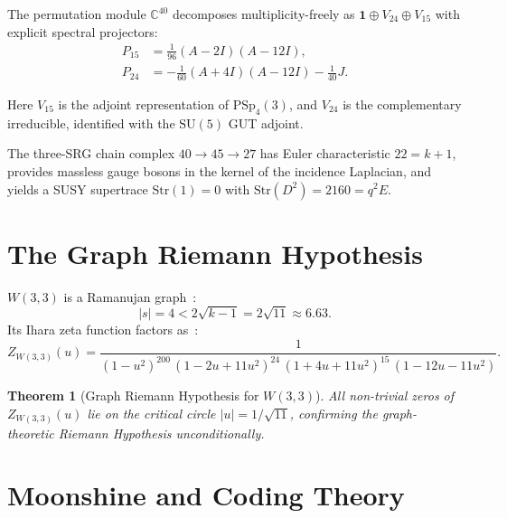 \documentclass[12pt,a4paper]{article}
\newtheorem{theorem}{Theorem}[section]
\begin{document}
The permutation module $\mathbb{C}^{40}$ decomposes multiplicity-freely as
$\mathbf{1} \oplus V_{24} \oplus V_{15}$ with explicit spectral projectors:
\begin{align}
  P_{15} &= \frac{1}{96}(A - 2I)(A - 12I),\\
  P_{24} &= -\frac{1}{60}(A + 4I)(A - 12I) - \frac{1}{40}J.
\end{align}

Here $V_{15}$ is the adjoint representation of $\mathrm{PSp}_4(3)$, and $V_{24}$
is the complementary irreducible, identified with the $\mathrm{SU}(5)$ GUT adjoint.

The three-SRG chain complex $40 \to 45 \to 27$ has Euler characteristic $22 = k+1$,
provides massless gauge bosons in the kernel of the incidence Laplacian, and yields
a SUSY supertrace $\mathrm{Str}(1) = 0$ with $\mathrm{Str}(D^2) = 2160 = q^2 E$.

\section{The Graph Riemann Hypothesis}

$W(3,3)$ is a Ramanujan graph~\cite{LubotzkyPhillipsSarnak1988}:
\begin{equation}
  |s| = 4 < 2\sqrt{k-1} = 2\sqrt{11} \approx 6.63.
\end{equation}
Its Ihara zeta function factors as~\cite{Ihara1966}:
\begin{equation}
  Z_{W(3,3)}(u) = \frac{1}{(1-u^2)^{200}\,(1 - 2u + 11u^2)^{24}\,
  (1 + 4u + 11u^2)^{15}\,(1 - 12u - 11u^2)}.
\end{equation}

\begin{theorem}[Graph Riemann Hypothesis for $W(3,3)$]
All non-trivial zeros of $Z_{W(3,3)}(u)$ lie on the critical circle $|u| = 1/\sqrt{11}$,
confirming the graph-theoretic Riemann Hypothesis unconditionally.
\end{theorem}

\section{Moonshine and Coding Theory}
\end{document}
